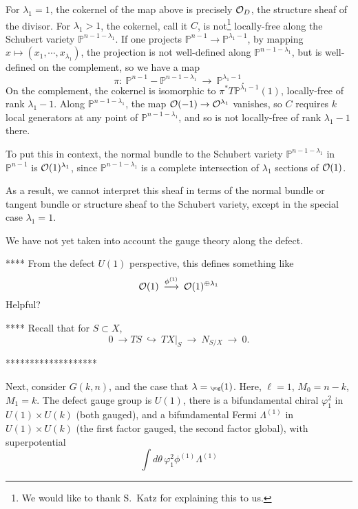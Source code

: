 \documentclass[12pt]{article}
\begin{document}
For $\lambda_1 = 1$, the cokernel of the map above
is precisely ${\cal O}_D$, the structure sheaf
of the divisor.  For $\lambda_1 > 1$, the cokernel, call it $C$, is
not\footnote{We would like to thank S.~Katz for explaining this to us.}
locally-free along the Schubert variety ${\mathbb P}^{n-1-\lambda_1}$.
If one projects ${\mathbb P}^{n-1} \rightarrow {\mathbb P}^{\lambda_1-1}$,
by mapping $x \mapsto (x_1, \cdots, x_{\lambda_1})$, the projection is not well-defined
along ${\mathbb P}^{n-1-\lambda_1}$, but is well-defined on the complement,
so we have a map
\begin{equation}
\pi: \: {\mathbb P}^{n-1} - {\mathbb P}^{n-1-\lambda_1} \: \longrightarrow
\: {\mathbb P}^{\lambda_1-1}.
\end{equation}
On the complement, the cokernel is isomorphic to $\pi^* T {\mathbb P}^{\lambda_1-1}(1)$,
locally-free of rank $\lambda_1-1$.  Along ${\mathbb P}^{n-1-\lambda_1}$, the
map ${\cal O}(-1) \rightarrow {\cal O}^{\lambda_1}$ vanishes, so $C$ requires
$k$ local generators at any point of ${\mathbb P}^{n-1-\lambda_1}$, and so is
not locally-free of rank $\lambda_1-1$ there.

To put this in context, the normal bundle to the Schubert variety
${\mathbb P}^{n-1-\lambda_1}$ in ${\mathbb P}^{n-1}$ is
${\cal O}(1)^{\lambda_1}$, since ${\mathbb P}^{n-1-\lambda_1}$ is a complete
intersection of $\lambda_1$ sections of ${\cal O}(1)$.

As a result, we cannot interpret this sheaf in terms of the normal bundle
or tangent bundle or structure sheaf to the Schubert variety,
except in the special case $\lambda_1 = 1$.

We have not yet taken into account the gauge theory along the defect.

**** From the defect $U(1)$ perspective, this defines something like
\begin{equation}
{\cal O}(1) \: \stackrel{\phi^{(1)}}{\longrightarrow} \:
{\cal O}(1)^{\oplus \lambda_1}
\end{equation}
Helpful?


**** Recall that for $S \subset X$,
\begin{equation}
0 \: \longrightarrow TS \: \hookrightarrow \: TX|_S \: \longrightarrow \:
N_{S/X} \: \longrightarrow \: 0.
\end{equation}

*******************

Next, consider $G(k,n)$, and the case that
$\lambda = \tiny\yng(1)$.
Here, $\ell = 1$, $M_0 = n-k$, $M_1 = k$.  The defect gauge group is $U(1)$,
there is a bifundamental chiral $\varphi_1^2$ in $U(1) \times U(k)$
(both gauged), and a bifundamental Fermi $\Lambda^{(1)}$ in
$U(1) \times U(k)$ (the first factor gauged, the second factor global),
with superpotential
\begin{equation}
\int d\theta \, \varphi_1^2 \phi^{(1)} \Lambda^{(1)}
\end{equation}
\end{document}
